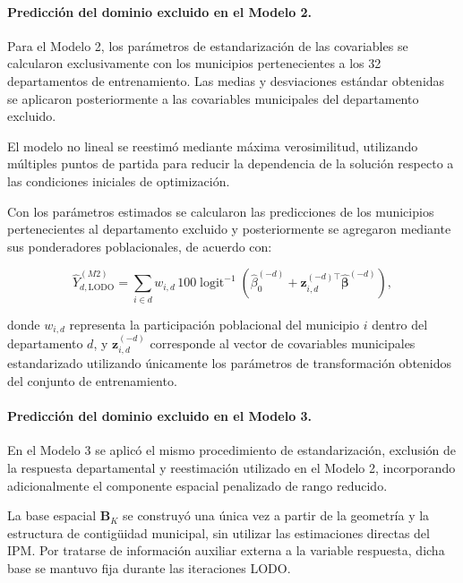 \paragraph{Predicción del dominio excluido en el Modelo 2.}

Para el Modelo 2, los parámetros de estandarización de las covariables se calcularon exclusivamente con los municipios pertenecientes a los 32 departamentos de entrenamiento. Las medias y desviaciones estándar obtenidas se aplicaron posteriormente a las covariables municipales del departamento excluido.

El modelo no lineal se reestimó mediante máxima verosimilitud, utilizando múltiples puntos de partida para reducir la dependencia de la solución respecto a las condiciones iniciales de optimización.

Con los parámetros estimados se calcularon las predicciones de los municipios pertenecientes al departamento excluido y posteriormente se agregaron mediante sus ponderadores poblacionales, de acuerdo con:

\begin{equation}
\widehat{Y}_{d,\mathrm{LODO}}^{(M2)}
=
\sum_{i\in d}
w_{i,d}\,
100\operatorname{logit}^{-1}
\left(
\widehat{\beta}_0^{(-d)}
+
\mathbf{z}_{i,d}^{(-d)\top}
\widehat{\boldsymbol{\beta}}^{(-d)}
\right),
\label{eq:lodo-m2}
\end{equation}

donde $w_{i,d}$ representa la participación poblacional del municipio $i$ dentro del departamento $d$, y $\mathbf{z}_{i,d}^{(-d)}$ corresponde al vector de covariables municipales estandarizado utilizando únicamente los parámetros de transformación obtenidos del conjunto de entrenamiento.

\paragraph{Predicción del dominio excluido en el Modelo 3.}

En el Modelo 3 se aplicó el mismo procedimiento de estandarización, exclusión de la respuesta departamental y reestimación utilizado en el Modelo 2, incorporando adicionalmente el componente espacial penalizado de rango reducido.

La base espacial $\mathbf{B}_K$ se construyó una única vez a partir de la geometría y la estructura de contigüidad municipal, sin utilizar las estimaciones directas del IPM. Por tratarse de información auxiliar externa a la variable respuesta, dicha base se mantuvo fija durante las iteraciones LODO.

